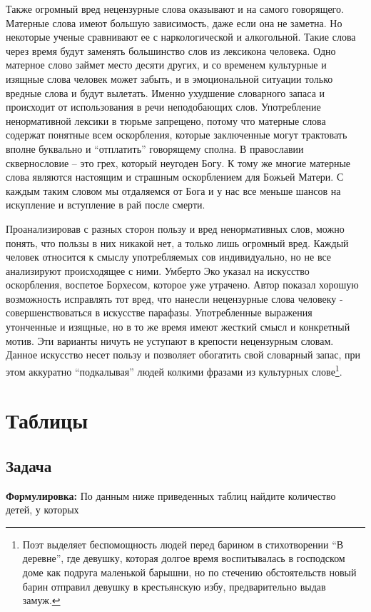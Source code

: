 \documentclass{report}
\begin{document}
Также огромный вред нецензурные слова оказывают и на самого говорящего. Матерные слова имеют большую зависимость, даже если она не заметна. Но некоторые ученые сравнивают ее с наркологической и алкогольной. Такие слова через время будут заменять большинство слов из лексикона человека. Одно матерное слово займет место десяти других, и со временем культурные и изящные слова человек может забыть, и в эмоциональной ситуации только вредные слова и будут вылетать. Именно ухудшение словарного запаса и происходит от использования в речи неподобающих слов. Употребление ненормативной лексики в тюрьме запрещено, потому что матерные слова содержат понятные всем оскорбления, которые заключенные могут трактовать вполне буквально и “отплатить” говорящему сполна. В православии сквернословие – это грех, который неугоден Богу. К тому же многие матерные слова являются настоящим и страшным оскорблением для Божьей Матери. С каждым таким словом мы отдаляемся от Бога и у нас все меньше шансов на искупление и вступление в рай после смерти. 

Проанализировав с разных сторон пользу и вред ненормативных слов, можно понять, что пользы в них никакой нет, а только лишь огромный вред. Каждый человек относится к смыслу употребляемых сов индивидуально, но не все анализируют происходящее с ними. Умберто Эко указал на искусство оскорбления, воспетое Борхесом, которое уже утрачено. Автор показал хорошую возможность исправлять тот вред, что нанесли нецензурные слова человеку - совершенствоваться в искусстве парафазы. Употребленные выражения утонченные и изящные, но в то же время имеют жесткий смысл и конкретный мотив. Эти варианты ничуть не уступают в крепости нецензурным словам. Данное искусство несет пользу и позволяет обогатить свой словарный запас, при этом аккуратно “подкалывая” людей колкими фразами из культурных слове\footnote{Поэт выделяет беспомощность людей перед барином в стихотворении “В
деревне”, где девушку, которая долгое время воспитывалась в господском
доме как подруга маленькой барышни, но по стечению обстоятельств новый
барин отправил девушку в крестьянскую избу, предварительно выдав замуж.}. 


\chapter{Таблицы}
\section{Задача }
\textbf{Формулировка:   }
По данным ниже приведенных таблиц найдите количество детей, у которых
\end{document}
